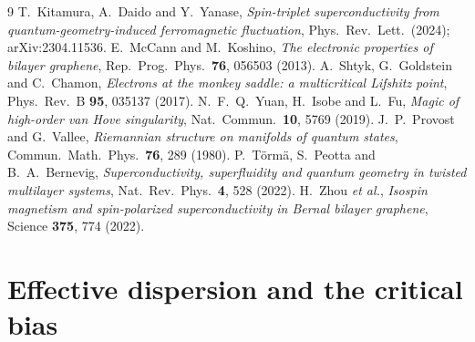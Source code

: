 \documentclass[11pt,a4paper]{article}
\numberwithin{equation}{section}
\begin{document}
\begin{thebibliography}{9}\small
{} T.~Kitamura, A.~Daido and Y.~Yanase, \emph{Spin-triplet superconductivity from quantum-geometry-induced ferromagnetic fluctuation}, Phys.\ Rev.\ Lett.\ (2024); arXiv:2304.11536.
 E.~McCann and M.~Koshino, \emph{The electronic properties of bilayer graphene}, Rep.\ Prog.\ Phys.\ \textbf{76}, 056503 (2013).
 A.~Shtyk, G.~Goldstein and C.~Chamon, \emph{Electrons at the monkey saddle: a multicritical Lifshitz point}, Phys.\ Rev.\ B \textbf{95}, 035137 (2017).
 N.~F.~Q.~Yuan, H.~Isobe and L.~Fu, \emph{Magic of high-order van Hove singularity}, Nat.\ Commun.\ \textbf{10}, 5769 (2019).
 J.~P.~Provost and G.~Vallee, \emph{Riemannian structure on manifolds of quantum states}, Commun.\ Math.\ Phys.\ \textbf{76}, 289 (1980).
 P.~T\"orm\"a, S.~Peotta and B.~A.~Bernevig, \emph{Superconductivity, superfluidity and quantum geometry in twisted multilayer systems}, Nat.\ Rev.\ Phys.\ \textbf{4}, 528 (2022).
 H.~Zhou \emph{et al.}, \emph{Isospin magnetism and spin-polarized superconductivity in Bernal bilayer graphene}, Science \textbf{375}, 774 (2022).
\end{thebibliography}


\clearpage
\appendix
\renewcommand{\thesection}{\Alph{section}}

\section{Effective dispersion and the critical bias}\label{app:dispersion}
\end{document}
